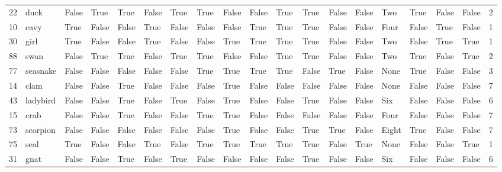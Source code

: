 \begin{tabular}{llllllllllllllllllr}
22  &        duck &  False &      True &   True &  False &      True &     True &     False &    False &      True &      True &     False &  False &    Two &   True &     False &    False &           2 \\
10  &        cavy &   True &     False &  False &   True &     False &    False &     False &     True &      True &      True &     False &  False &   Four &  False &      True &    False &           1 \\
30  &        girl &   True &     False &  False &   True &     False &    False &      True &     True &      True &      True &     False &  False &    Two &  False &      True &     True &           1 \\
88  &        swan &  False &      True &   True &  False &      True &     True &     False &    False &      True &      True &     False &  False &    Two &   True &     False &     True &           2 \\
77  &    seasnake &  False &     False &  False &  False &     False &     True &      True &     True &      True &     False &      True &  False &   None &   True &     False &    False &           3 \\
14  &        clam &  False &     False &   True &  False &     False &    False &      True &    False &     False &     False &     False &  False &   None &  False &     False &    False &           7 \\
43  &    ladybird &  False &     False &   True &  False &      True &    False &      True &    False &     False &      True &     False &  False &    Six &  False &     False &    False &           6 \\
15  &        crab &  False &     False &   True &  False &     False &     True &      True &    False &     False &     False &     False &  False &   Four &  False &     False &    False &           7 \\
73  &    scorpion &  False &     False &  False &  False &     False &    False &      True &    False &     False &      True &      True &  False &  Eight &   True &     False &    False &           7 \\
75  &        seal &   True &     False &  False &   True &     False &     True &      True &     True &      True &      True &     False &   True &   None &  False &     False &     True &           1 \\
31  &        gnat &  False &     False &   True &  False &      True &    False &     False &    False &     False &      True &     False &  False &    Six &  False &     False &    False &           6 \\

\end{tabular}
